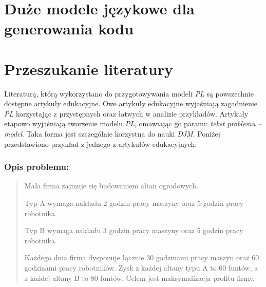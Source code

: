 \section{Duże modele językowe dla generowania kodu}


\section{Przeszukanie literatury}
Literaturą, którą wykorzystano do przygotowywania modeli \textit{PL} są powszechnie dostępne artykuły edukacyjne. Owe artykuły edukacyjne wyjaśniają zagadnienie \textit{PL} korzystając z przystępnych oraz łatwych w analizie przykładów. Artykuły etapowo wyjaśniają tworzenie modelu \textit{PL}, omawiając go parami: \textit{tekst problemu -- model}. Taka forma jest szczególnie korzystna do nauki \textit{DJM}. Poniżej przedstawiono przykład z jednego z artykułów edukacyjnych\cite{cimt}:

\subsubsection*{Opis problemu:} \label{sec:model_example}
\begin{quote}
Mała firma zajmuje się budowaniem altan ogrodowych.

Typ A wymaga nakładu 2 godzin pracy maszyny oraz 5 godzin pracy robotnika.  

Typ B wymaga nakładu 3 godzin pracy maszyny oraz 5 godzin pracy robotnika. 

Każdego dnia firma dysponuje łącznie 30 godzinami pracy maszyn oraz 60 godzinami pracy robotników. Zysk z każdej altany typu A to 60 funtów, a z każdej altany B to 80 funtów. Celem jest maksymalizacja profitu firmy.

\end{quote}

